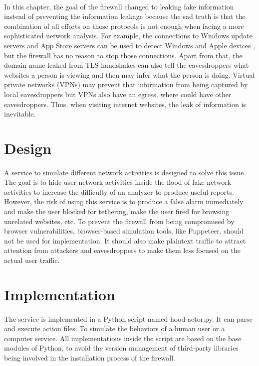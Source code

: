 \documentclass[mscthesis]{usiinfthesis}
\begin{document}
\paragraph{}
In this chapter, the goal of the firewall changed to leaking fake information instead of preventing the information leakage because the sad truth is that the combination of all efforts on those protocols is not enough when facing a more sophisticated network analysis. For example, the connections to Windows update servers and App Store servers can be used to detect Windows and Apple devices \citep{osandtether}, but the firewall has no reason to stop those connections. Apart from that, the domain name leaked from TLS handshakes can also tell the eavesdroppers what websites a person is viewing and then may infer what the person is doing. Virtual private networks (VPNs) may prevent that information from being captured by local eavesdroppers but VPNs also have an egress, where could have other eavesdroppers. Thus, when visiting internet websites, the leak of information is inevitable.

\section{Design}
\paragraph{}
A service to simulate different network activities is designed to solve this issue. The goal is to hide user network activities inside the flood of fake network activities to increase the difficulty of an analyzer to produce useful reports. However, the risk of using this service is to produce a false alarm immediately and make the user blocked for tethering, make the user fired for browsing unrelated websites, etc. To prevent the firewall from being compromised by browser vulnerabilities, browser-based simulation tools, like Puppeteer, should not be used for implementation. It should also make plaintext traffic to attract attention from attackers and eavesdroppers to make them less focused on the actual user traffic.

\section{Implementation}
\paragraph{}
The service is implemented in a Python script named hood-actor.py. It can parse and execute action files. To simulate the behaviors of a human user or a computer service. All implementations inside the script are based on the base modules of Python, to avoid the version management of third-party libraries being involved in the installation process of the firewall.
\end{document}
